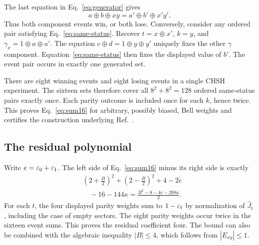 The last equation in Eq.~\eqref{eq:generator} gives
\begin{equation}\label{eq:same-status}
 a\oplus b\oplus xy=a'\oplus b'\oplus x'y'.
\end{equation}
Thus both component events win, or both lose. Conversely, consider any ordered pair satisfying Eq.~\eqref{eq:same-status}. Recover $t=x\oplus x'$, $k=y$, and $\gamma_x=1\oplus a\oplus a'$. The equation $c\oplus d=1\oplus y\oplus y'$ uniquely fixes the other $\gamma$ component. Equation~\eqref{eq:same-status} then fixes the displayed value of $b'$. The event pair occurs in exactly one generated set.

There are eight winning events and eight losing events in a single CHSH experiment. The sixteen sets therefore cover all $8^2+8^2=128$ ordered same-status pairs exactly once. Each parity outcome is included once for each $k$, hence twice. This proves Eq.~\eqref{eq:sum16} for arbitrary, possibly biased, Bell weights and certifies the construction underlying Ref.~\cite[Eq.~(10)]{cabello}.

\subsection{The residual polynomial}
Write $e=\varepsilon_0+\varepsilon_1$. The left side of Eq.~\eqref{eq:sum16} minus its right side is exactly
\begin{equation}\label{eq:residual-polynomial}
\begin{aligned}
 &\left(2+\frac B2\right)^2+\left(2-\frac B2\right)^2+4-2e\\
 &\quad-16-144\kappa=\frac{B^2-8-4e-288\kappa}{2}.
\end{aligned}
\end{equation}
For each $t$, the four displayed parity weights sum to $1-\varepsilon_t$ by normalization of $\widehat J_t$, including the case of empty sectors. The eight parity weights occur twice in the sixteen event sums. This proves the residual coefficient four. The bound can also be combined with the algebraic inequality $|B|\leq4$, which follows from $|E_{xy}|\leq1$.

